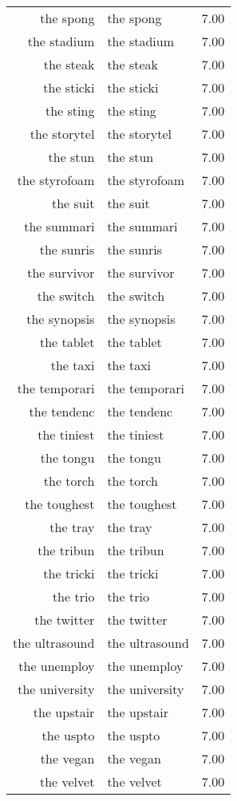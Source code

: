 \begin{table}[ht]
\begin{tabular}{rlr}
  the spong & the spong & 7.00 \\ 
  the stadium & the stadium & 7.00 \\ 
  the steak & the steak & 7.00 \\ 
  the sticki & the sticki & 7.00 \\ 
  the sting & the sting & 7.00 \\ 
  the storytel & the storytel & 7.00 \\ 
  the stun & the stun & 7.00 \\ 
  the styrofoam & the styrofoam & 7.00 \\ 
  the suit & the suit & 7.00 \\ 
  the summari & the summari & 7.00 \\ 
  the sunris & the sunris & 7.00 \\ 
  the survivor & the survivor & 7.00 \\ 
  the switch & the switch & 7.00 \\ 
  the synopsis & the synopsis & 7.00 \\ 
  the tablet & the tablet & 7.00 \\ 
  the taxi & the taxi & 7.00 \\ 
  the temporari & the temporari & 7.00 \\ 
  the tendenc & the tendenc & 7.00 \\ 
  the tiniest & the tiniest & 7.00 \\ 
  the tongu & the tongu & 7.00 \\ 
  the torch & the torch & 7.00 \\ 
  the toughest & the toughest & 7.00 \\ 
  the tray & the tray & 7.00 \\ 
  the tribun & the tribun & 7.00 \\ 
  the tricki & the tricki & 7.00 \\ 
  the trio & the trio & 7.00 \\ 
  the twitter & the twitter & 7.00 \\ 
  the ultrasound & the ultrasound & 7.00 \\ 
  the unemploy & the unemploy & 7.00 \\ 
  the university & the university & 7.00 \\ 
  the upstair & the upstair & 7.00 \\ 
  the uspto & the uspto & 7.00 \\ 
  the vegan & the vegan & 7.00 \\ 
  the velvet & the velvet & 7.00 \\ 

\end{tabular}
\end{table}
